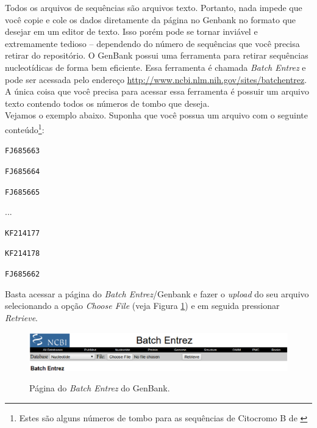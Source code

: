\begin{refsection}
Todos os arquivos de sequências são arquivos texto. Portanto, nada impede que você copie e cole os dados diretamente da página no Genbank no formato que desejar em um editor de texto. Isso porém pode se tornar inviável e extremamente tedioso -- dependendo do número de sequências que você precisa retirar do repositório. O GenBank possui uma ferramenta para retirar sequências nucleotídicas de forma bem eficiente. Essa ferramenta é chamada \textit{Batch Entrez} e pode ser acessada pelo endereço \url{http://www.ncbi.nlm.nih.gov/sites/batchentrez}. A única coisa que você precisa para acessar essa ferramenta é possuir um arquivo texto contendo todos os números de tombo que deseja.\\

	Vejamos o exemplo abaixo. Suponha que você possua um arquivo com o seguinte conteúdo\footnote{ Estes são alguns números de tombo para as sequências de Citocromo B de \textcite{dias_et_al_2013}}:\\
\scriptsize

\noindent\texttt{FJ685663}

\noindent\texttt{FJ685664}

\noindent\texttt{FJ685665}


...


\noindent\texttt{KF214177}

\noindent\texttt{KF214178}

\noindent\texttt{FJ685662}

\normalsize

Basta acessar a página do \textit{Batch Entrez}/Genbank e fazer o \textit{upload} do seu arquivo selecionando a opção \textit{Choose File} (veja Figura \ref{tut7:fig:bacth_entrez}) e em seguida pressionar \textit{Retrieve}.

  \begin{figure}[H]
      {\includegraphics[scale=0.5]{figures/tut7/entrez.eps}}
	{\caption[GenBnank \textit{Batch Entrez}]{Página do \textit{Batch Entrez} do GenBank.}\label{tut7:fig:bacth_entrez}}
  \end{figure}



\end{refsection}
